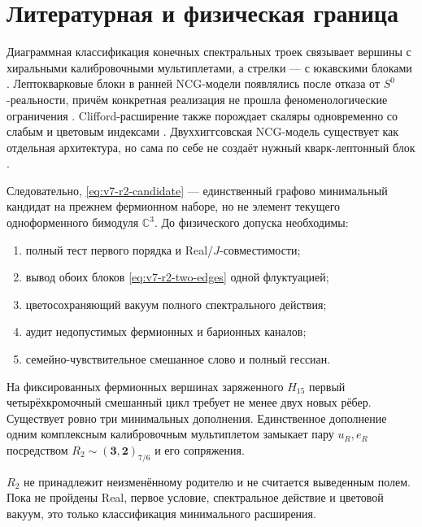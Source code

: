 \section{Литературная и физическая граница}

Диаграммная классификация конечных спектральных троек связывает вершины с
хиральными калибровочными мультиплетами, а стрелки --- с юкавскими блоками
\cite{v7connector-krajewski}. Лептокварковые блоки в ранней NCG-модели
появлялись после отказа от $S^0$-реальности, причём конкретная реализация
не прошла феноменологические ограничения \cite{v7connector-paschke}.
Clifford-расширение также порождает скаляры одновременно со слабым и
цветовым индексами \cite{v7connector-kurkov}. Двуххиггсовская NCG-модель
существует как отдельная архитектура, но сама по себе не создаёт нужный
кварк-лептонный блок \cite{v7connector-jimenez}.

Следовательно, \eqref{eq:v7-r2-candidate} --- единственный графово
минимальный кандидат на прежнем фермионном наборе, но не элемент текущего
одноформенного бимодуля $\mathbb C^3$. До физического допуска необходимы:
\begin{enumerate}
 \item полный тест первого порядка и Real/$J$-совместимости;
 \item вывод обоих блоков \eqref{eq:v7-r2-two-edges} одной флуктуацией;
 \item цветосохраняющий вакуум полного спектрального действия;
 \item аудит недопустимых фермионных и барионных каналов;
 \item семейно-чувствительное смешанное слово и полный гессиан.
\end{enumerate}

\begin{theorem}
На фиксированных фермионных вершинах заряженного $H_{15}$ первый
четырёхкромочный смешанный цикл требует не менее двух новых рёбер. Существует
ровно три минимальных дополнения. Единственное дополнение одним комплексным
калибровочным мультиплетом замыкает пару $u_R,e_R$ посредством
$R_2\sim(\mathbf3,\mathbf2)_{7/6}$ и его сопряжения.
\end{theorem}

\begin{nogocriterion}
$R_2$ не принадлежит неизменённому родителю и не считается выведенным
полем. Пока не пройдены Real, первое условие, спектральное действие и
цветовой вакуум, это только классификация минимального расширения.
\end{nogocriterion}

